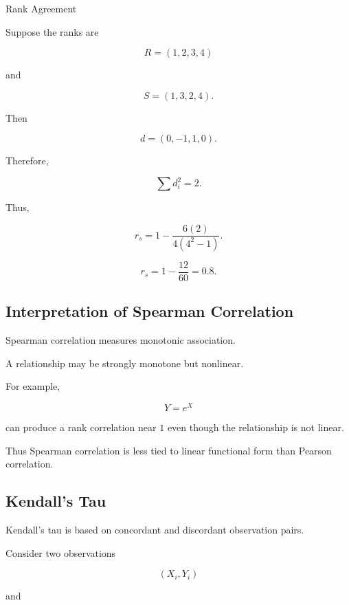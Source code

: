 \begin{workedexamplebox}{Rank Agreement}

Suppose the ranks are

\[
R=(1,2,3,4)
\]

and

\[
S=(1,3,2,4).
\]

Then

\[
d=(0,-1,1,0).
\]

Therefore,

\[
\sum d_i^2
=
2.
\]

Thus,

\[
r_s
=
1
-
\frac{
6(2)
}{
4(4^2-1)
}.
\]

\begin{answerbox}
\[
\boxed{
r_s
=
1-\frac{12}{60}
=
0.8.
}
\]
\end{answerbox}

\end{workedexamplebox}

\subsection{Interpretation of Spearman Correlation}
\label{subsec:spearman-interpretation}

Spearman correlation measures monotonic association.

A relationship may be strongly monotone but nonlinear.

For example,

\[
Y=e^X
\]

can produce a rank correlation near \(1\) even though the relationship
is not linear.

Thus Spearman correlation is less tied to linear functional form than
Pearson correlation.

\subsection{Kendall's Tau}
\label{subsec:kendalls-tau}

Kendall's tau is based on concordant and discordant observation pairs.

Consider two observations

\[
(X_i,Y_i)
\]

and

